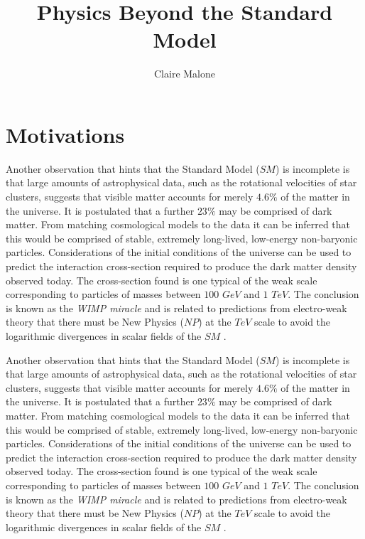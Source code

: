 \documentclass[a4paper,12pt]{article}
\begin{document}
\author{Claire Malone}
\title{Physics Beyond the Standard Model }
\maketitle
\tableofcontents

\section{Motivations}
Another observation that hints that the Standard Model ($SM$) is incomplete is that large amounts of astrophysical data, such as the rotational velocities of star clusters, suggests that visible matter accounts for merely $4.6\%$ of the matter in the universe. It is postulated that a further $23\%$ may be comprised of dark matter. From matching cosmological models to the data it can be inferred that this would be comprised of stable, extremely long-lived, low-energy non-baryonic particles. Considerations of the initial conditions of the universe can be used to predict the interaction cross-section required to produce the dark matter density observed today. The cross-section found is one typical of the weak scale corresponding to particles of masses between $100$ $ GeV$ and $1$ $ TeV$. The conclusion is known as the {\it WIMP miracle} and is related to predictions from electro-weak theory that there must be New Physics ($NP$) at the $TeV$ scale to avoid the logarithmic divergences in scalar fields of the $SM$ \cite[p. 12]{paper1}. 



Another observation that hints that the Standard Model ($SM$) is incomplete is that large amounts of astrophysical data, such as the rotational velocities of star clusters, suggests that visible matter accounts for merely $4.6\%$ of the matter in the universe. It is postulated that a further $23\%$ may be comprised of dark matter. From matching cosmological models to the data it can be inferred that this would be comprised of stable, extremely long-lived, low-energy non-baryonic particles. Considerations of the initial conditions of the universe can be used to predict the interaction cross-section required to produce the dark matter density observed today. The cross-section found is one typical of the weak scale corresponding to particles of masses between $100$ $ GeV$ and $1$ $ TeV$. The conclusion is known as the {\it WIMP miracle} and is related to predictions from electro-weak theory that there must be New Physics ($NP$) at the $TeV$ scale to avoid the logarithmic divergences in scalar fields of the $SM$ \cite[p. 12]{paper1}. 
\end{document}
